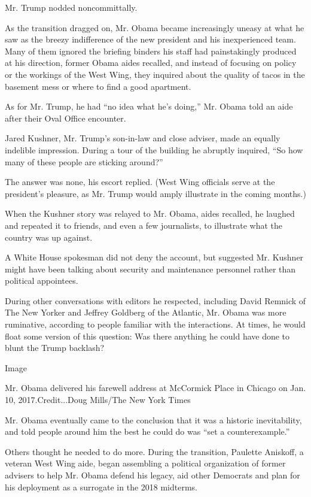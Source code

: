 Mr. Trump nodded noncommittally.

As the transition dragged on, Mr. Obama became increasingly uneasy at
what he saw as the breezy indifference of the new president and his
inexperienced team. Many of them ignored the briefing binders his staff
had painstakingly produced at his direction, former Obama aides
recalled, and instead of focusing on policy or the workings of the West
Wing, they inquired about the quality of tacos in the basement mess or
where to find a good apartment.

As for Mr. Trump, he had ``no idea what he's doing,'' Mr. Obama told an
aide after their Oval Office encounter.

Jared Kushner, Mr. Trump's son-in-law and close adviser, made an equally
indelible impression. During a tour of the building he abruptly
inquired, ``So how many of these people are sticking around?''

The answer was none, his escort replied. (West Wing officials serve at
the president's pleasure, as Mr. Trump would amply illustrate in the
coming months.)

When the Kushner story was relayed to Mr. Obama, aides recalled, he
laughed and repeated it to friends, and even a few journalists, to
illustrate what the country was up against.

A White House spokesman did not deny the account, but suggested Mr.
Kushner might have been talking about security and maintenance personnel
rather than political appointees.

During other conversations with editors he respected, including David
Remnick of The New Yorker and Jeffrey Goldberg of the Atlantic, Mr.
Obama was more ruminative, according to people familiar with the
interactions. At times, he would float some version of this question:
Was there anything he could have done to blunt the Trump backlash?

Image

Mr. Obama delivered his farewell address at McCormick Place in Chicago
on Jan. 10, 2017.Credit...Doug Mills/The New York Times

Mr. Obama eventually came to the conclusion that it was a historic
inevitability, and told people around him the best he could do was ``set
a counterexample.''

Others thought he needed to do more. During the transition, Paulette
Aniskoff, a veteran West Wing aide, began assembling a political
organization of former advisers to help Mr. Obama defend his legacy, aid
other Democrats and plan for his deployment as a surrogate in the 2018
midterms.

